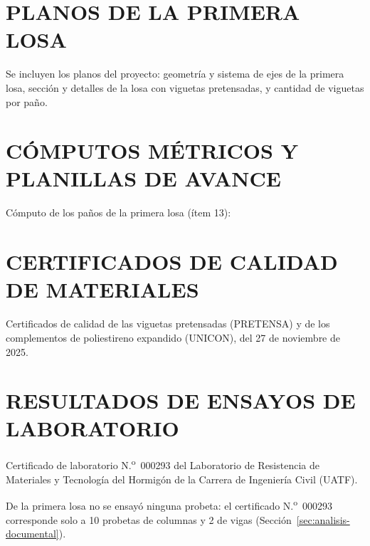 \chapter{PLANOS DE LA PRIMERA LOSA}
\label{anx:planos}
Se incluyen los planos del proyecto: geometría y sistema de ejes de la primera losa, sección y detalles de la losa con viguetas pretensadas, y cantidad de viguetas por paño.




\chapter{CÓMPUTOS MÉTRICOS Y PLANILLAS DE AVANCE}

Cómputo de los paños de la primera losa (ítem 13):


\chapter{CERTIFICADOS DE CALIDAD DE MATERIALES}
Certificados de calidad de las viguetas pretensadas (PRETENSA) y de los complementos de poliestireno expandido (UNICON), del 27 de noviembre de 2025.


\chapter{RESULTADOS DE ENSAYOS DE LABORATORIO}
Certificado de laboratorio N.\textsuperscript{o}~000293 del Laboratorio de Resistencia de Materiales y Tecnología del Hormigón de la Carrera de Ingeniería Civil (UATF).

De la primera losa no se ensayó ninguna probeta: el certificado N.\textsuperscript{o}~000293 corresponde solo a 10 probetas de columnas y 2 de vigas (Sección~\ref{sec:analisis-documental}).

